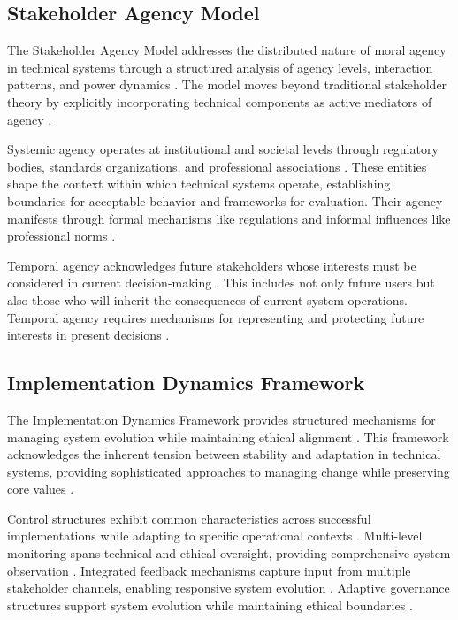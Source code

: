 \documentclass[12pt]{article}
\begin{document}
\subsection{Stakeholder Agency Model}

The Stakeholder Agency Model addresses the distributed nature of moral agency in technical systems through a structured analysis of agency levels, interaction patterns, and power dynamics \parencite{mitchell1997}. The model moves beyond traditional stakeholder theory \parencite{donaldson1995} by explicitly incorporating technical components as active mediators of agency \parencite{latour2005,law1992}.

Systemic agency operates at institutional and societal levels through regulatory bodies, standards organizations, and professional associations \parencite{yeung2018}. These entities shape the context within which technical systems operate, establishing boundaries for acceptable behavior and frameworks for evaluation. Their agency manifests through formal mechanisms like regulations and informal influences like professional norms \parencite{dignum2019}.

Temporal agency acknowledges future stakeholders whose interests must be considered in current decision-making \parencite{vandenhoven2013}. This includes not only future users but also those who will inherit the consequences of current system operations. Temporal agency requires mechanisms for representing and protecting future interests in present decisions \parencite{nissenbaum2010}.

\subsection{Implementation Dynamics Framework}

The Implementation Dynamics Framework provides structured mechanisms for managing system evolution while maintaining ethical alignment \parencite{march1991}. This framework acknowledges the inherent tension between stability and adaptation in technical systems, providing sophisticated approaches to managing change while preserving core values \parencite{argyris1978}.

Control structures exhibit common characteristics across successful implementations while adapting to specific operational contexts \parencite{desanctis1994}. Multi-level monitoring spans technical and ethical oversight, providing comprehensive system observation \parencite{yeung2018}. Integrated feedback mechanisms capture input from multiple stakeholder channels, enabling responsive system evolution \parencite{friedman2008}. Adaptive governance structures support system evolution while maintaining ethical boundaries \parencite{dignum2019}.
\end{document}
